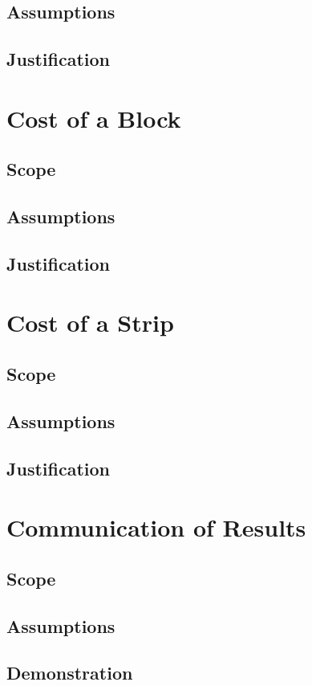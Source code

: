 \subsection{Assumptions}
\subsection{Justification}

\section{Cost of a Block}
\subsection{Scope}
\subsection{Assumptions}
\subsection{Justification}

\section{Cost of a Strip}
\subsection{Scope}
\subsection{Assumptions}
\subsection{Justification}

\section{Communication of Results}
\subsection{Scope}
\subsection{Assumptions}
\subsection{Demonstration}